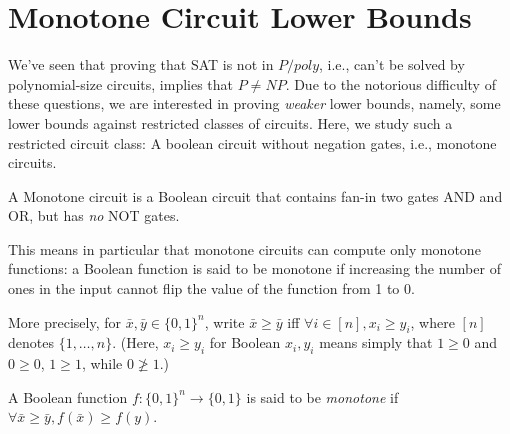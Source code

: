 %
%
%





\chapter{Monotone Circuit Lower Bounds}
\label{sec:Razborov} %



We've seen that proving that SAT is not in $P/poly$, i.e., can't be solved by polynomial-size circuits, implies that $P \neq NP$.
Due to the notorious difficulty of these questions, we are interested in proving \emph{weaker} lower bounds, namely, some lower bounds against restricted classes of circuits. 
Here, we study such a restricted circuit class: A boolean circuit without negation gates, i.e., monotone circuits.

\begin{definition}
A Monotone circuit is a Boolean circuit that contains fan-in two gates AND and OR, but has \emph{no} NOT gates.
\end{definition}

This means in particular that monotone circuits can compute only monotone functions: a Boolean function is said to be monotone if increasing the number of ones in the input cannot flip the value of the function from 1 to 0. 

More precisely, for $\bar{x}, \bar{y} \in\{0,1\}^n$, write $\bar{x} \geqslant \bar{y}$ iff $ \forall i \in [n], x_i \geqslant y_i$, where $[n]$ denotes $\{1,\dots,n\}$. (Here, $x_i\ge y_i$ for Boolean $x_i,y_i$ means simply that $1\ge 0$ and $0\ge 0$, $1\ge 1$, while $0\not\ge 1$.)

\begin{definition}
A Boolean function $f:\{0,1\}^n \rightarrow\{0,1\}$ is said to be  \emph{monotone} if $\forall \bar{x} \geq \bar{y}, f(\bar{x}) \geqslant f(y)$.
\end{definition}


